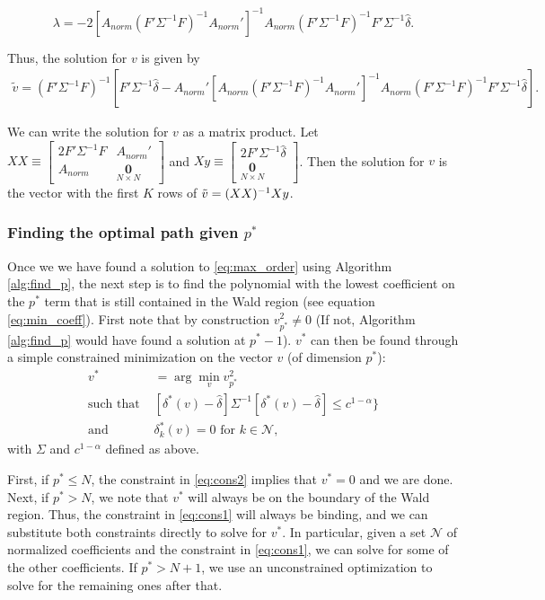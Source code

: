 \documentclass[bib]{./sty/statapress}
\begin{document}
\begin{equation*}
\lambda = -2[A_{norm}(F'\Sigma^{-1}F)^{-1}A_{norm}']^{-1}A_{norm}(F'\Sigma^{-1}F)^{-1} F' \Sigma^{-1} \hat{\delta}.
\end{equation*}

Thus, the solution for $v$ is given by
\begin{align*}
\tilde v= (F'\Sigma^{-1}F)^{-1} \left[ F' \Sigma^{-1} \hat{\delta} - A_{norm}'[A_{norm}(F'\Sigma^{-1}F)^{-1}A_{norm}']^{-1}A_{norm} (F'\Sigma^{-1}F)^{-1}F' \Sigma^{-1} \hat{\delta}\right].
\end{align*}

We can write the solution for $v$ as a matrix product. Let $XX \equiv \begin{bmatrix} 2F'\Sigma^{-1}F & A_{norm}' \\ A_{norm} & \underset{N \times N} {\mathbf{0}} \end{bmatrix} $ and $Xy \equiv \begin{bmatrix} 2F'\Sigma^{-1}\hat{\delta} \\ \underset{N \times N}{\mathbf{0}} \end{bmatrix} $. Then the solution for $v$ is the vector with the first $K$ rows of $\Tilde{v} = (XX)^{-1} Xy$.

\subsubsection{Finding the optimal path given $p^*$}


Once we we have found a solution to \eqref{eq:max_order} using Algorithm \ref{alg:find_p}, the next step is to find the polynomial with the lowest coefficient on the $p^*$ term that is still contained in the Wald region (see equation \ref{eq:min_coeff}). First note that by construction $v^2_{p^*} \ne 0$ (If not, Algorithm \ref{alg:find_p} would have found a solution at $p^*-1$). $v^*$ can then be found through a simple constrained minimization on the vector $v$ (of dimension $p^*$):
\begin{align}
v^* &= \arg\min_{v} v_{p^*}^2 \label{eq:obj}\\
\text{such that }  & [\delta^*(v)-\hat{\delta}]\Sigma^{-1}[\delta^*(v)-\hat{\delta}] \le c^{1-\alpha}\} \label{eq:cons1}\\
\text{and } & \delta_{k}^*(v)=0 \text{ for } k \in \mathcal{N}, \label{eq:cons2}
\end{align}
with $\Sigma$ and $c^{1-\alpha}$ defined as above.

First, if $p^* \le N$, the constraint in \eqref{eq:cons2} implies that $v^*=0$ and we are done.
Next, if $p^*>N$, we note that $v^*$ will always be on the boundary of the Wald region. Thus, the constraint in \eqref{eq:cons1} will always be binding, and we can substitute both constraints directly to solve for $v^*$. In particular, given a set $\mathcal{N}$ of normalized coefficients and the constraint in \eqref{eq:cons1}, we can solve for some of the other coefficients. If $p^*>N+1$, we use an unconstrained optimization to solve for the remaining ones after that.
\end{document}
